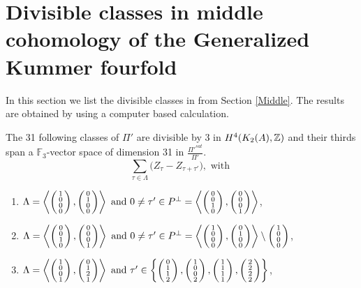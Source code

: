 
\section{Divisible classes in middle cohomology of the Generalized Kummer fourfold}\label{SpecialClasses}
In this section we list the divisible classes in from Section \ref{Middle}. The results are obtained by using a computer based calculation.
\begin{prop}\label{XXXI}
The 31 following classes of $\Pi'$ are divisible by 3 in $H^{4}(K_2(A),\Z)$ and their thirds span a $\mathbb F_3$-vector space of dimension 31 in $\frac{\Pi'^{sat}}{\Pi'}$.
$$\sum_{\tau\in\Lambda} \Big(Z_{\tau} - Z_{\tau+\tau'}\Big), \text{ with }$$
\begin{enumerate}
\item
$\Lambda=\plan{1\\0\\0\\0}{0\\1\\0\\0} \text{ and } 0\neq \tau'\in P^\perp = \plan{0\\0\\1\\0}{0\\0\\0\\1} $,

\item
$\Lambda=\plan{0\\0\\1\\0}{0\\0\\0\\1}  \text{ and } 0\neq \tau' \in P^\perp = \plan{1\\0\\0\\0}{0\\1\\0\\0} \setminus \vect{1\\0\\0\\0}$,

\item
$\Lambda=\plan{1\\0\\0\\1}{0\\1\\2\\1} \text{ and } \tau' \in \left\{ \vect{0\\1\\1\\2},\vect{1\\0\\0\\2},\vect{1\\1\\1\\1},\vect{2\\2\\2\\2} \right\}$,


\end{enumerate}
\end{prop}
